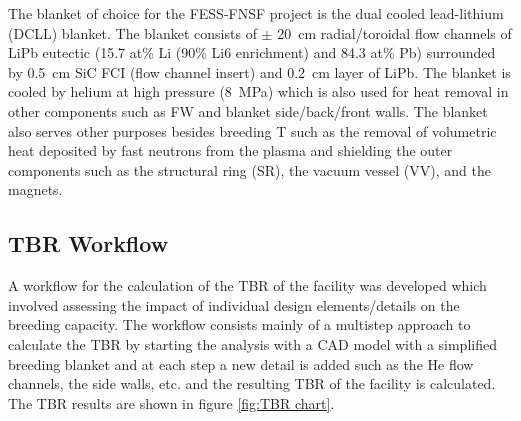 \documentclass[12pt, letterpaper]{elsarticle}
\begin{document}
The blanket of choice for the FESS-FNSF project is the dual cooled lead-lithium (DCLL) \cite{ref_11} blanket. The blanket consists of $\pm$ \SI{20}{cm} radial/toroidal flow channels of LiPb eutectic (15.7 at\% Li (90\% Li6 enrichment) and 84.3 at\% Pb) surrounded by \SI{0.5}{cm} SiC FCI (flow channel insert) and \SI{0.2}{cm} layer of LiPb. The blanket is cooled by helium at high pressure (\SI{8}{MPa}) which is also used for heat removal in other components such as FW and blanket side/back/front walls. The blanket also serves other purposes besides breeding T such as the removal of volumetric heat deposited by fast neutrons from the plasma and shielding the outer components such as the structural ring (SR), the vacuum vessel (VV), and the magnets.

\subsection{TBR Workflow} \label{TBR Workflow}
A workflow for the calculation of the TBR of the facility was developed which involved assessing the impact of individual design elements/details on the breeding capacity. The workflow consists mainly of a multistep approach to calculate the TBR by starting the analysis with a CAD model with a simplified breeding blanket and at each step a new detail is added such as the He flow channels, the side walls, etc. and the resulting TBR of the facility is calculated. The TBR results are shown in figure \ref{fig:TBR chart}. \vspace{5mm}
\end{document}
